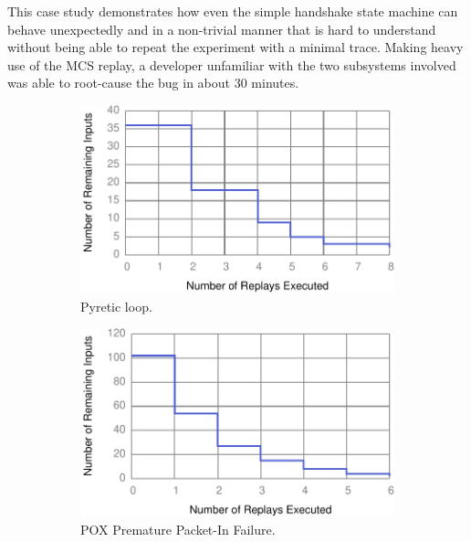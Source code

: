 This case study demonstrates how even the simple handshake state machine can
behave unexpectedly and in a non-trivial manner that is hard to understand
without being able to repeat the experiment with a minimal trace. Making heavy
use of the MCS replay, a developer unfamiliar with the two subsystems involved
was able to root-cause the bug in about 30 minutes.
\begin{figure}[!htb]
\begin{subfigure}{0.33\textwidth}
    \includegraphics[width=\textwidth]{../graphs/runtime/pyretic_loop.pdf}
    \caption[]{\label{fig:pyretic_loop} Pyretic loop.}
\end{subfigure}\hfill
\begin{subfigure}{0.33\textwidth}
    \includegraphics[width=\textwidth]{../graphs/runtime/pox_early_packetin.pdf}
    \caption[]{\label{fig:pox_handshake} POX Premature Packet-In Failure.}
\end{subfigure}\hfill
\begin{subfigure}{0.33\textwidth}

\end{subfigure}
\end{figure}
